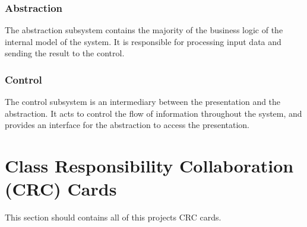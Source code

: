 \documentclass[]{article}
\begin{document}
\subsubsection{Abstraction}

The abstraction subsystem contains the majority of the business logic of the
internal model of the system. It is responsible for processing input data and
sending the result to the control.

\subsubsection{Control}

The control subsystem is an intermediary between the presentation and the
abstraction. It acts to control the flow of information throughout the system,
and provides an interface for the abstraction to access the presentation.


	
\section{Class Responsibility Collaboration (CRC) Cards}
\label{sec:class_responsibility_collaboration_crc_cards}
This section should contains all of this projects CRC cards.
\end{document}
